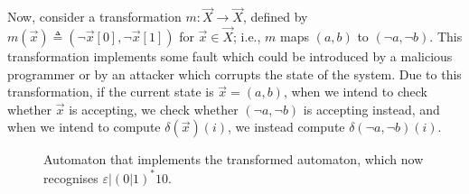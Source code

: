 Now, consider a transformation %
$m\colon \vec{X}\rightarrow\vec{X}$, defined by $m(\vec{x})\triangleq(\lnot \vec{x}[0],\lnot \vec{x}[1])$ for $\vec{x}\in \vec{X}$; i.e., $m$ maps $(a,b)$ to $(\lnot a, \lnot b)$. This transformation implements some fault which could be introduced by a malicious programmer or by an attacker which corrupts the state of the system. Due to this transformation, %
if the current state is $\vec{x}=(a,b)$, when we intend to check whether $\vec{x}$ is accepting, we check whether $(\lnot a, \lnot b)$ is accepting instead, and when we intend to compute $\delta(\vec{x})(i)$, we instead compute $\delta(\lnot a, \lnot b)(i)$. 
\begin{figure}[t]
    \centering
{}
\caption{Automaton that implements the transformed automaton, which now recognises $\varepsilon|(0|1)^*10$.}
\label{fig:Transformed}
\end{figure}

